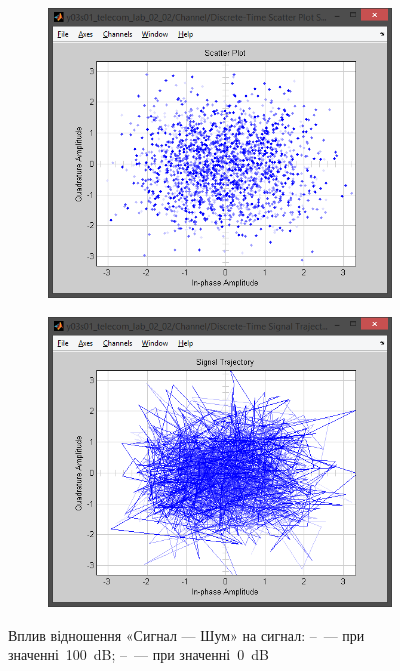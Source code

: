 \documentclass[
	a4paper,
	oneside,
	BCOR = 10mm,
	DIV = 12,
	12pt,
	headings = normal,
]{scrartcl}
\begin{document}
\begin{figure}[!htbp]
\begin{subfigure}{\textwidth / 3}
						\caption{}
						\label{subfig:rolloff-0p0-eye-out}
					\end{subfigure}%
					\begin{subfigure}{\textwidth / 3}
						\centering
						\includegraphics[height = 7\baselineskip]{../01-solution/01-SNR-00-db-channel-scatter-plot.png}
						\caption{}
						\label{subfig:rolloff-0p0-signal-trajectory-out}
					\end{subfigure}%
					\begin{subfigure}{\textwidth / 3}
						\centering
						\includegraphics[height = 7\baselineskip]{../01-solution/01-SNR-00-db-channel-signal-trajectory.png}
						\caption{}
						\label{subfig:rolloff-0p0-scatter-plot-out}
					\end{subfigure}%
					\caption{Вплив відношення «Сигнал — Шум» на сигнал: –~— при значенні~\SI{100}{\deci\bel}; –~— при значенні~\SI{0}{\deci\bel}}
					\label{fig:rolloff-0p0-plots}
				\end{figure}
\end{document}

